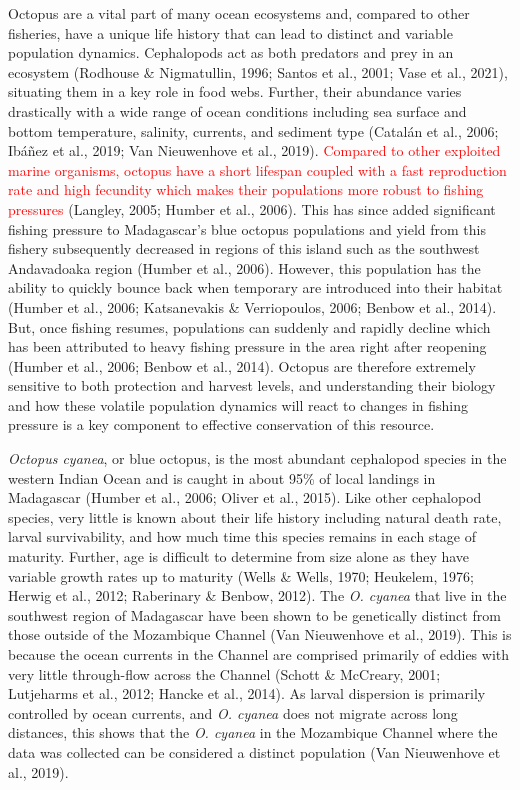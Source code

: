 \documentclass[
]{article}
\begin{document}
Octopus are a vital part of many ocean ecosystems and, compared to other fisheries, have a unique life history that can lead to distinct and variable population dynamics. Cephalopods act as both predators and prey in an ecosystem (Rodhouse \& Nigmatullin, 1996; Santos et al., 2001; Vase et al., 2021), situating them in a key role in food webs. Further, their abundance varies drastically with a wide range of ocean conditions including sea surface and bottom temperature, salinity, currents, and sediment type (Catalán et al., 2006; Ibáñez et al., 2019; Van Nieuwenhove et al., 2019). \textcolor{red}{Compared to other exploited marine organisms, octopus have a short lifespan coupled with a fast reproduction rate and high fecundity which makes their populations more robust to fishing pressures} (Langley, 2005; Humber et al., 2006). This has since added significant fishing pressure to Madagascar's blue octopus populations and yield from this fishery subsequently decreased in regions of this island such as the southwest Andavadoaka region (Humber et al., 2006). However, this population has the ability to quickly bounce back when temporary are introduced into their habitat (Humber et al., 2006; Katsanevakis \& Verriopoulos, 2006; Benbow et al., 2014). But, once fishing resumes, populations can suddenly and rapidly decline which has been attributed to heavy fishing pressure in the area right after reopening (Humber et al., 2006; Benbow et al., 2014). Octopus are therefore extremely sensitive to both protection and harvest levels, and understanding their biology and how these volatile population dynamics will react to changes in fishing pressure is a key component to effective conservation of this resource.

\emph{Octopus cyanea}, or blue octopus, is the most abundant cephalopod species in the western Indian Ocean and is caught in about 95\% of local landings in Madagascar (Humber et al., 2006; Oliver et al., 2015). Like other cephalopod species, very little is known about their life history including natural death rate, larval survivability, and how much time this species remains in each stage of maturity. Further, age is difficult to determine from size alone as they have variable growth rates up to maturity (Wells \& Wells, 1970; Heukelem, 1976; Herwig et al., 2012; Raberinary \& Benbow, 2012). The \emph{O. cyanea} that live in the southwest region of Madagascar have been shown to be genetically distinct from those outside of the Mozambique Channel (Van Nieuwenhove et al., 2019). This is because the ocean currents in the Channel are comprised primarily of eddies with very little through-flow across the Channel (Schott \& McCreary, 2001; Lutjeharms et al., 2012; Hancke et al., 2014). As larval dispersion is primarily controlled by ocean currents, and \emph{O. cyanea} does not migrate across long distances, this shows that the \emph{O. cyanea} in the Mozambique Channel where the data was collected can be considered a distinct population (Van Nieuwenhove et al., 2019).
\end{document}
